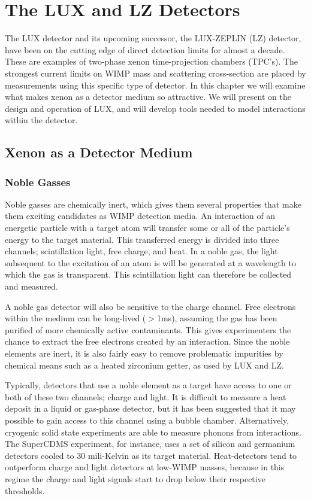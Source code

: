 \chapter{The LUX and LZ Detectors}
The LUX detector and its upcoming successor, the LUX-ZEPLIN (LZ) detector, have been on the cutting edge of direct detection limits for almost a decade. These are examples of two-phase xenon time-projection chambers (TPC's). The strongest current limits on WIMP mass and scattering cross-section are placed by measurements using this specific type of detector. In this chapter we will examine what makes xenon as a detector medium so attractive. We will present on the design and operation of LUX, and will develop tools needed to model interactions within the detector.

\section{Xenon as a Detector Medium}
\subsection{Noble Gasses}
Noble gasses are chemically inert, which gives them several properties that make them exciting candidates as WIMP detection media. An interaction of an energetic particle with a target atom will transfer some or all of the particle's energy to the target material. This transferred energy is divided into three channels; scintillation light, free charge, and heat. In a noble gas, the light subsequent to the excitation of an atom is will be generated at a wavelength to which the gas is transparent. This scintillation light can therefore be collected and measured.

A noble gas detector will also be sensitive to the charge channel. Free electrons within the medium can be long-lived ($>$1ms), assuming the gas has been purified of more chemically active contaminants. This gives experimenters the chance to extract the free electrons created by an interaction. Since the noble elements are inert, it is also fairly easy to remove problematic impurities by chemical means such as a heated zirconium getter, as used by LUX and LZ.

Typically, detectors that use a noble element as a target have access to one or both of these two channels; charge and light. It is difficult to measure a heat deposit in a liquid or gas-phase detector, but it has been suggested that it may possible to gain access to this channel using a bubble chamber\cite{bubble}. Alternatively, cryogenic solid state experiments are able to measure phonons from interactions. The SuperCDMS experiment, for instance, uses a set of silicon and germanium detectors cooled to 30 mili-Kelvin as its target material\cite{cdms}. Heat-detectors tend to outperform charge and light detectors at low-WIMP masses, because in this regime the charge and light signals start to drop below their respective thresholds.

